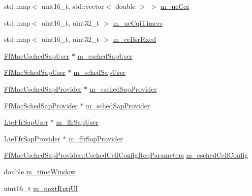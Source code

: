 \begin{DoxyCompactItemize}
\item 
std\+::map$<$ uint16\+\_\+t, std\+::vector$<$ double $>$ $>$ \hyperlink{classns3_1_1CqaFfMacScheduler_a263024e4342a26bfc2fabd0697da8641}{m\+\_\+ue\+Cqi}
\item 
std\+::map$<$ uint16\+\_\+t, uint32\+\_\+t $>$ \hyperlink{classns3_1_1CqaFfMacScheduler_a3393d690f2b1d2a41e428b87318b15e1}{m\+\_\+ue\+Cqi\+Timers}
\item 
std\+::map$<$ uint16\+\_\+t, uint32\+\_\+t $>$ \hyperlink{classns3_1_1CqaFfMacScheduler_ae2ec92c28a8adb7f5d63d658fd1e3949}{m\+\_\+ce\+Bsr\+Rxed}
\item 
\hyperlink{classns3_1_1FfMacCschedSapUser}{Ff\+Mac\+Csched\+Sap\+User} $\ast$ \hyperlink{classns3_1_1CqaFfMacScheduler_a66b7628e6f04aa658ff04050221243b9}{m\+\_\+csched\+Sap\+User}
\item 
\hyperlink{classns3_1_1FfMacSchedSapUser}{Ff\+Mac\+Sched\+Sap\+User} $\ast$ \hyperlink{classns3_1_1CqaFfMacScheduler_a42f4b19ce093643c5fa8202ac18ec569}{m\+\_\+sched\+Sap\+User}
\item 
\hyperlink{classns3_1_1FfMacCschedSapProvider}{Ff\+Mac\+Csched\+Sap\+Provider} $\ast$ \hyperlink{classns3_1_1CqaFfMacScheduler_a04e8005367e22a36fb264a71382c2ac1}{m\+\_\+csched\+Sap\+Provider}
\item 
\hyperlink{classns3_1_1FfMacSchedSapProvider}{Ff\+Mac\+Sched\+Sap\+Provider} $\ast$ \hyperlink{classns3_1_1CqaFfMacScheduler_ac139d5e64c1bdd47b31e3f8ae1633ebc}{m\+\_\+sched\+Sap\+Provider}
\item 
\hyperlink{classns3_1_1LteFfrSapUser}{Lte\+Ffr\+Sap\+User} $\ast$ \hyperlink{classns3_1_1CqaFfMacScheduler_a68b05ba68f164a5acf308ce7dd18e57c}{m\+\_\+ffr\+Sap\+User}
\item 
\hyperlink{classns3_1_1LteFfrSapProvider}{Lte\+Ffr\+Sap\+Provider} $\ast$ \hyperlink{classns3_1_1CqaFfMacScheduler_a47eeb31f5d284b045d6deba40ac3e108}{m\+\_\+ffr\+Sap\+Provider}
\item 
\hyperlink{structns3_1_1FfMacCschedSapProvider_1_1CschedCellConfigReqParameters}{Ff\+Mac\+Csched\+Sap\+Provider\+::\+Csched\+Cell\+Config\+Req\+Parameters} \hyperlink{classns3_1_1CqaFfMacScheduler_ad5dc768ca3a3c71671fd64de7de8ec00}{m\+\_\+csched\+Cell\+Config}
\item 
double \hyperlink{classns3_1_1CqaFfMacScheduler_a2e6951b5a91130305fe3d835bca0f33d}{m\+\_\+time\+Window}
\item 
uint16\+\_\+t \hyperlink{classns3_1_1CqaFfMacScheduler_adc4185e06ef2d451669d3b1b4f0d7760}{m\+\_\+next\+Rnti\+Ul}
\item 

\end{DoxyCompactItemize}
